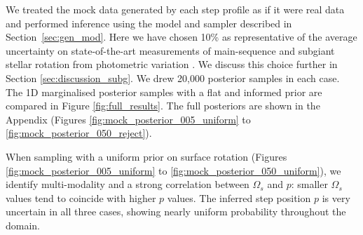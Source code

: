 We treated the mock data generated by each step profile as if it were real data and performed inference using the model and sampler described in Section~\ref{sec:gen_mod}.  Here we have chosen 10\% as representative of the average uncertainty on state-of-the-art measurements of main-sequence and subgiant stellar rotation from photometric variation \citep{santos_surface_2021}. We discuss this choice further in Section \ref{sec:discussion_subg}. We drew 20,000 posterior samples in each case. The 1D marginalised posterior samples with a flat and informed prior are compared in Figure \ref{fig:full_results}. The full posteriors are shown in the Appendix (Figures \ref{fig:mock_posterior_005_uniform} to \ref{fig:mock_posterior_050_reject}). 

When sampling with a uniform prior on surface rotation (Figures \ref{fig:mock_posterior_005_uniform} to  \ref{fig:mock_posterior_050_uniform}), we identify multi-modality and a strong correlation between $\Omega_s$ and $p$: smaller $\Omega_s$ values tend to coincide with higher $p$ values. The inferred step position $p$ is very uncertain in all three cases, showing nearly uniform probability throughout the domain.

